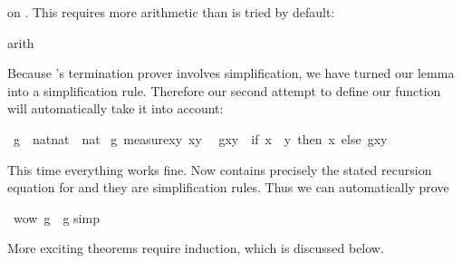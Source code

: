 \begin{isabellebody}
\begin{isamarkuptxt}
on . This requires more arithmetic than is tried by default:%
\end{isamarkuptxt}%
arith{\isacharparenright}%
\begin{isamarkuptext}%
\noindent
Because 's termination prover involves simplification,
we have turned our lemma into a simplification rule. Therefore our second
attempt to define our function will automatically take it into account:%
\end{isamarkuptext}%
\ g\ {\isacharcolon}{\isacharcolon}\ {\isachardoublequote}nat{\isacharasterisk}nat\ {\isasymRightarrow}\ nat{\isachardoublequote}\isanewline
{}\ g\ {\isachardoublequote}measure{\isacharparenleft}{\isasymlambda}{\isacharparenleft}x{\isacharcomma}y{\isacharparenright}{\isachardot}\ x{\isacharminus}y{\isacharparenright}{\isachardoublequote}\isanewline
\ \ {\isachardoublequote}g{\isacharparenleft}x{\isacharcomma}y{\isacharparenright}\ {\isacharequal}\ {\isacharparenleft}if\ x\ {\isasymle}\ y\ then\ x\ else\ g{\isacharparenleft}x{\isacharcomma}y{\isacharplus}%
\begin{isamarkuptext}%
\noindent
This time everything works fine. Now  contains precisely
the stated recursion equation for  and they are simplification
rules. Thus we can automatically prove%
\end{isamarkuptext}%
\ wow{\isacharcolon}\ {\isachardoublequote}g{\isacharparenleft}\ {\isacharequal}\ g{\isacharparenleft}\isanewline
{}simp{\isacharparenright}%
\begin{isamarkuptext}%
\noindent
More exciting theorems require induction, which is discussed below.


\end{isamarkuptext}
\end{isabellebody}
